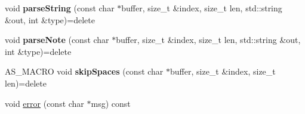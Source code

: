 \begin{DoxyCompactItemize}
\item 
\mbox{\label{classx2_1_1_lexical_parser_a114cc369f550f24b5b5a06ba1b622347}} 
void {\bfseries parse\+String} (const char $\ast$buffer, size\+\_\+t \&index, size\+\_\+t len, std\+::string \&out, int \&type)=delete
\item 
\mbox{\label{classx2_1_1_lexical_parser_a5955d1d987c91e7620ac06548f37a53c}} 
void {\bfseries parse\+Note} (const char $\ast$buffer, size\+\_\+t \&index, size\+\_\+t len, std\+::string \&out, int \&type)=delete
\item 
\mbox{\label{classx2_1_1_lexical_parser_a79e43313b550c378106a04017c92b54d}} 
A\+S\+\_\+\+M\+A\+C\+RO void {\bfseries skip\+Spaces} (const char $\ast$buffer, size\+\_\+t \&index, size\+\_\+t len)=delete
\item 
void \hyperlink{classx2_1_1_lexical_parser_aa3c5fdf7dcce41c49671b5361992dc83}{error} (const char $\ast$msg) const
\end{DoxyCompactItemize}
